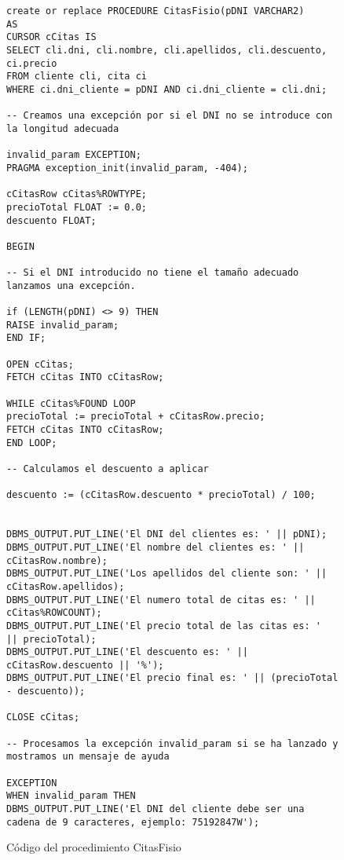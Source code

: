 \begin{figure}[H]
    \begin{tcolorbox}[sharp corners, colback=yellow!30, colframe=white!20]
        \tiny
        \begin{verbatim}
create or replace PROCEDURE CitasFisio(pDNI VARCHAR2)
AS
CURSOR cCitas IS
SELECT cli.dni, cli.nombre, cli.apellidos, cli.descuento, ci.precio
FROM cliente cli, cita ci
WHERE ci.dni_cliente = pDNI AND ci.dni_cliente = cli.dni;

-- Creamos una excepción por si el DNI no se introduce con la longitud adecuada

invalid_param EXCEPTION;
PRAGMA exception_init(invalid_param, -404);

cCitasRow cCitas%ROWTYPE;
precioTotal FLOAT := 0.0;
descuento FLOAT;

BEGIN

-- Si el DNI introducido no tiene el tamaño adecuado lanzamos una excepción.

if (LENGTH(pDNI) <> 9) THEN
RAISE invalid_param;
END IF;

OPEN cCitas;
FETCH cCitas INTO cCitasRow;

WHILE cCitas%FOUND LOOP
precioTotal := precioTotal + cCitasRow.precio;
FETCH cCitas INTO cCitasRow;
END LOOP;

-- Calculamos el descuento a aplicar

descuento := (cCitasRow.descuento * precioTotal) / 100;


DBMS_OUTPUT.PUT_LINE('El DNI del clientes es: ' || pDNI);
DBMS_OUTPUT.PUT_LINE('El nombre del clientes es: ' || cCitasRow.nombre);
DBMS_OUTPUT.PUT_LINE('Los apellidos del cliente son: ' || cCitasRow.apellidos);
DBMS_OUTPUT.PUT_LINE('El numero total de citas es: ' || cCitas%ROWCOUNT);
DBMS_OUTPUT.PUT_LINE('El precio total de las citas es: '  || precioTotal);
DBMS_OUTPUT.PUT_LINE('El descuento es: ' || cCitasRow.descuento || '%');
DBMS_OUTPUT.PUT_LINE('El precio final es: ' || (precioTotal - descuento));

CLOSE cCitas;

-- Procesamos la excepción invalid_param si se ha lanzado y mostramos un mensaje de ayuda

EXCEPTION
WHEN invalid_param THEN
DBMS_OUTPUT.PUT_LINE('El DNI del cliente debe ser una cadena de 9 caracteres, ejemplo: 75192847W');

        \end{verbatim}
    \end{tcolorbox}
    \caption{Código del procedimiento CitasFisio}
\end{figure}

%
%

